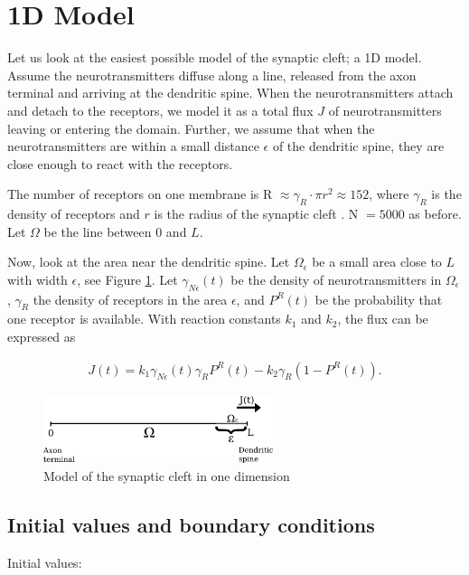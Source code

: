 \section{1D Model}

Let us look at the easiest possible model of the synaptic cleft; a 1D model. Assume the neurotransmitters diffuse along a line, released from the axon terminal and arriving at the dendritic spine. When the neurotransmitters attach and detach to the receptors, we model it as a total flux $J$ of neurotransmitters leaving or entering the domain. Further, we assume that when the neurotransmitters are within a small distance $\epsilon$ of the dendritic spine, they are close enough to react with the receptors.

The number of receptors on one membrane is R $\approx \gamma_R \cdot \pi r^2 \approx 152$, where $\gamma_R$ is the density of receptors and $r$ is the radius of the synaptic cleft \cite{task}. N $= 5000$ as before. Let $\Omega$ be the line between $0$ and $L$.

Now, look at the area near the dendritic spine. Let $\Omega_{\epsilon}$ be a small area close to $L$ with width $\epsilon$, see Figure \ref{fig:model_1d}. Let $\gamma_{N\epsilon}(t)$ be the density of neurotransmitters in $\Omega_{\epsilon}$, $\gamma_R$ the density of receptors in the area $\epsilon$, and $P^R(t)$ be the probability that one receptor is available. With reaction constants $k_1$ and $k_2$, the flux can be expressed as

\begin{align*}
J(t) = k_1 \gamma_{N\epsilon}(t) \gamma_R P^R(t) - k_2 \gamma_R (1-P^R(t)).
\end{align*}


\begin{figure}[ht]
        \centering
        \includegraphics[clip=true,width=0.6\textwidth]{model_1d}
        \caption{Model of the synaptic cleft in one dimension}
        \label{fig:model_1d}
\end{figure}
\subsection{Initial values and boundary conditions}

Initial values:

